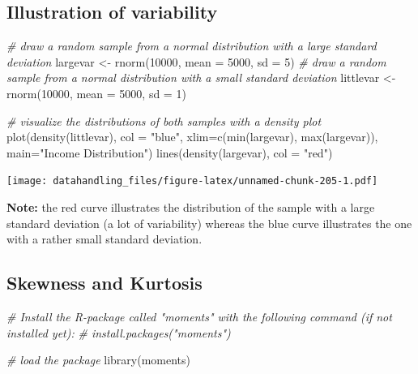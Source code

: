 \documentclass[
  12pt,
]{style/krantz}
\newenvironment{Shaded}{\begin{snugshade}}{\end{snugshade}}
\newcommand{\AttributeTok}[1]{\textcolor[rgb]{0.77,0.63,0.00}{#1}}
\newcommand{\CommentTok}[1]{\textcolor[rgb]{0.56,0.35,0.01}{\textit{#1}}}
\newcommand{\DecValTok}[1]{\textcolor[rgb]{0.00,0.00,0.81}{#1}}
\newcommand{\FunctionTok}[1]{\textcolor[rgb]{0.00,0.00,0.00}{#1}}
\newcommand{\NormalTok}[1]{#1}
\newcommand{\OtherTok}[1]{\textcolor[rgb]{0.56,0.35,0.01}{#1}}
\newcommand{\StringTok}[1]{\textcolor[rgb]{0.31,0.60,0.02}{#1}}
\begin{document}
\hypertarget{illustration-of-variability}{%
\subsection{Illustration of variability}\label{illustration-of-variability}}

\begin{Shaded}
\begin{Highlighting}[]
\CommentTok{\# draw a random sample from a normal distribution with a large standard deviation}
\NormalTok{largevar }\OtherTok{\textless{}{-}} \FunctionTok{rnorm}\NormalTok{(}\DecValTok{10000}\NormalTok{, }\AttributeTok{mean =} \DecValTok{5000}\NormalTok{, }\AttributeTok{sd =} \DecValTok{5}\NormalTok{)}
\CommentTok{\# draw a random sample from a normal distribution with a small standard deviation}
\NormalTok{littlevar }\OtherTok{\textless{}{-}} \FunctionTok{rnorm}\NormalTok{(}\DecValTok{10000}\NormalTok{, }\AttributeTok{mean =} \DecValTok{5000}\NormalTok{, }\AttributeTok{sd =} \DecValTok{1}\NormalTok{)}

\CommentTok{\# visualize the distributions of both samples with a density plot}
\FunctionTok{plot}\NormalTok{(}\FunctionTok{density}\NormalTok{(littlevar), }\AttributeTok{col =} \StringTok{"blue"}\NormalTok{, }
     \AttributeTok{xlim=}\FunctionTok{c}\NormalTok{(}\FunctionTok{min}\NormalTok{(largevar), }\FunctionTok{max}\NormalTok{(largevar)), }\AttributeTok{main=}\StringTok{"Income Distribution"}\NormalTok{)}
\FunctionTok{lines}\NormalTok{(}\FunctionTok{density}\NormalTok{(largevar), }\AttributeTok{col =} \StringTok{"red"}\NormalTok{)}
\end{Highlighting}
\end{Shaded}

\texttt{[image: datahandling\_files/figure-latex/unnamed-chunk-205-1.pdf]}

\textbf{Note:} the red curve illustrates the distribution of the sample with a large standard deviation (a lot of variability) whereas the blue curve illustrates the one with a rather small standard deviation.

\hypertarget{skewness-and-kurtosis}{%
\subsection{Skewness and Kurtosis}\label{skewness-and-kurtosis}}

\begin{Shaded}
\begin{Highlighting}[]
\CommentTok{\# Install the R{-}package called "moments" with the following command (if not installed yet):}
\CommentTok{\# install.packages("moments")}

\CommentTok{\# load the package}
\FunctionTok{library}\NormalTok{(moments)}
\end{Highlighting}
\end{Shaded}
\end{document}
